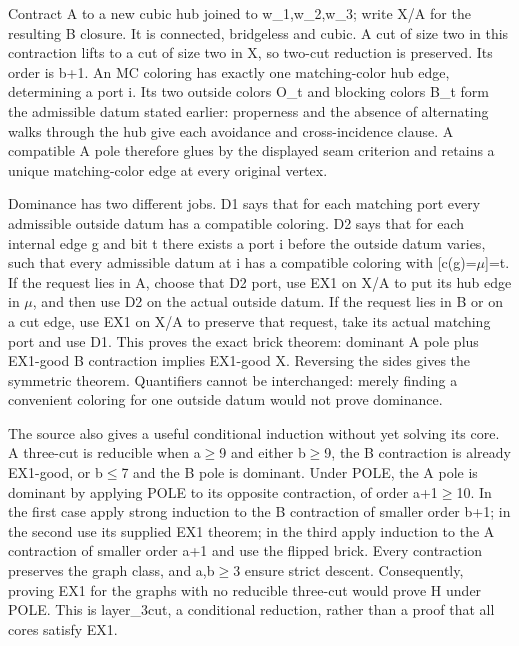 \documentclass[11pt,a4paper]{article}
\begin{document}
Contract A to a new cubic hub joined to w\_1,w\_2,w\_3; write X/A for the resulting B closure. It is connected, bridgeless and cubic. A cut of size two in this contraction lifts to a cut of size two in X, so two-cut reduction is preserved. Its order is b+1. An MC coloring has exactly one matching-color hub edge, determining a port i. Its two outside colors O\_t and blocking colors B\_t form the admissible datum stated earlier: properness and the absence of alternating walks through the hub give each avoidance and cross-incidence clause. A compatible A pole therefore glues by the displayed seam criterion and retains a unique matching-color edge at every original vertex.

Dominance has two different jobs. D1 says that for each matching port every admissible outside datum has a compatible coloring. D2 says that for each internal edge g and bit t there exists a port i before the outside datum varies, such that every admissible datum at i has a compatible coloring with [c(g)=\ensuremath{\mu}]=t. If the request lies in A, choose that D2 port, use EX1 on X/A to put its hub edge in \ensuremath{\mu}, and then use D2 on the actual outside datum. If the request lies in B or on a cut edge, use EX1 on X/A to preserve that request, take its actual matching port and use D1. This proves the exact brick theorem: dominant A pole plus EX1-good B contraction implies EX1-good X. Reversing the sides gives the symmetric theorem. Quantifiers cannot be interchanged: merely finding a convenient coloring for one outside datum would not prove dominance.

The source also gives a useful conditional induction without yet solving its core. A three-cut is reducible when a\ensuremath{\geq}9 and either b\ensuremath{\geq}9, the B contraction is already EX1-good, or b\ensuremath{\leq}7 and the B pole is dominant. Under POLE, the A pole is dominant by applying POLE to its opposite contraction, of order a+1\ensuremath{\geq}10. In the first case apply strong induction to the B contraction of smaller order b+1; in the second use its supplied EX1 theorem; in the third apply induction to the A contraction of smaller order a+1 and use the flipped brick. Every contraction preserves the graph class, and a,b\ensuremath{\geq}3 ensure strict descent. Consequently, proving EX1 for the graphs with no reducible three-cut would prove H under POLE. This is layer\_3cut, a conditional reduction, rather than a proof that all cores satisfy EX1.
\end{document}
